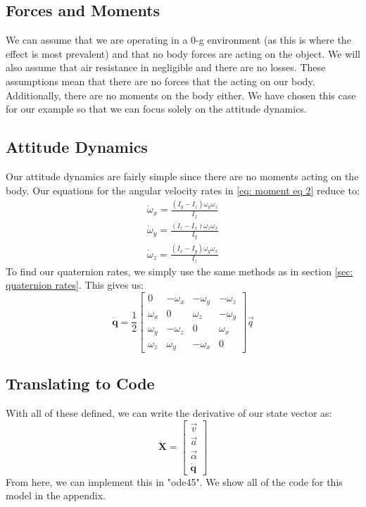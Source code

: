 \documentclass[12pt]{report}
\begin{document}
\subsection{Forces and Moments}
We can assume that we are operating in a 0-g environment (as this is where the effect is most prevalent) and that no body forces are acting on the object. We will also assume that air resistance in negligible and there are no losses. These assumptions mean that there are no forces that the acting on our body. Additionally, there are no moments on the body either. We have chosen this case for our example so that we can focus solely on the attitude dynamics.
\subsection{Attitude Dynamics}
Our attitude dynamics are fairly simple since there are no moments acting on the body. Our equations for the angular velocity rates in \eqref{eq: moment eq 2} reduce to:
\begin{gather}\label{eq: moment eq dzhan}
    \dot{\omega}_x=\frac{\left(I_y-I_z\right)\omega_y\omega_z}{I_x}\\
    \dot{\omega}_y=\frac{\left(I_z-I_x\right)\omega_z\omega_x}{I_y}\\
    \dot{\omega}_z=\frac{\left(I_x-I_y\right)\omega_y\omega_x}{I_z}
\end{gather}
To find our \gls{quaternion} rates, we simply use the same methods as in section \ref{sec: quaternion rates}. This gives us:
\begin{equation}
    \dot{\textbf{q}}=\frac{1}{2}\begin{bmatrix}
        0&-\omega_x&-\omega_y&-\omega_z\\
        \omega_x&0&\omega_z&-\omega_y\\
        \omega_y&-\omega_z&0&\omega_x\\
        \omega_z&\omega_y&-\omega_x&0
    \end{bmatrix}\vec{q}
\end{equation}
\subsection{Translating to Code}
With all of these defined, we can write the derivative of our \gls{state vector} as:
\begin{equation}
    \dot{\textbf{X}}=\begin{bmatrix}
        \vec{v}\\\vec{a}\\\vec{\alpha}\\\dot{\textbf{q}}
    \end{bmatrix}
\end{equation}
From here, we can implement this in "ode45". We show all of the code for this model in the appendix.
\end{document}
